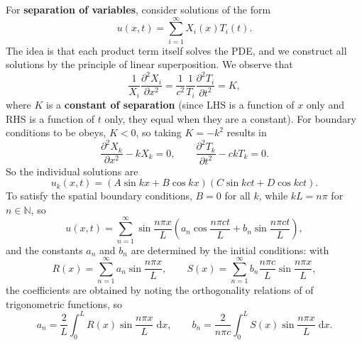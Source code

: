 \documentclass[letter-paper]{tufte-book}
\newcommand{\dy}{\partial}
\newcommand{\ddy}[2]{\frac{\dy#1}{\dy#2}}
\newcommand\Def[1]{\textbf{#1}}
\begin{document}
For \Def{separation of variables}, consider solutions of the form
\begin{equation*}
  u(x, t) = \sum_{i=1}^\infty X_i(x) T_i(t).
\end{equation*}
The idea is that each product term itself solves the PDE, and we construct all
solutions by the principle of linear superposition. We observe that
\begin{equation*}
  \frac{1}{X_i}\ddy{^2 X_i}{x^2} = \frac{1}{c^2}\frac{1}{T_i}\ddy{^2 T_i}{t^2} = K,
\end{equation*}
where $K$ is a \Def{constant of separation} (since LHS is a function of
$x$ only and RHS is a function of $t$ only, they equal when they are a
constant). For boundary conditions to be obeys, $K < 0$, so taking $K =
-k^2$ results in
\begin{equation*}
  \ddy{^2 X_k}{x^2} - k X_k = 0, \qquad
  \ddy{^2 T_k}{t^2} - ck T_k = 0.
\end{equation*}
So the individual solutions are
\begin{equation*}
  u_k(x,t) = \left(A \sin kx + B\cos kx\right) \left(C \sin kct + D\cos kct\right).
\end{equation*}
To satisfy the spatial boundary conditions, $B = 0$ for all $k$, while $kL =
n\pi$ for $n \in \mathbb{N}$, so
\begin{equation*}
  u(x, t) = \sum_{n=1}^\infty \sin\frac{n\pi x}{L} \left(a_n \cos\frac{n\pi ct}{L} + b_n \sin \frac{n\pi ct}{L} \right),
\end{equation*}
and the constants $a_n$ and $b_n$ are determined by the initial conditions:
with
\begin{equation*}
  R(x) = \sum_{n=1}^\infty a_n \sin \frac{n\pi x}{L}, \qquad
  S(x) = \sum_{n=1}^\infty b_n \frac{n\pi c}{L}\sin \frac{n\pi x}{L},
\end{equation*}
the coefficients are obtained by noting the orthogonality relations of of
trigonometric functions, so
\begin{equation*}
  a_n = \frac{2}{L} \int_0^L R(x) \sin\frac{n\pi x}{L}\; \mathrm{d}x, \qquad
  b_n = \frac{2}{n\pi c} \int_0^L S(x) \sin\frac{n\pi x}{L}\; \mathrm{d}x.
\end{equation*}
\end{document}

